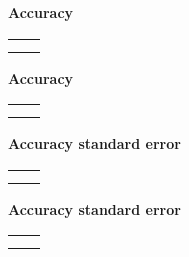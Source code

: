 \documentclass[a4paper]{article}
\begin{document}
\begin{landscape}
\begin{center}
{\Large\bf Accuracy}\\
\begin{tabular}{cc}
 & \\
 & \\
\end{tabular}
\end{center}
\newpage
\begin{center}
{\Large\bf Accuracy}\\
\begin{tabular}{cc}
 & \\
 & \\
\end{tabular}
\end{center}
\newpage
\begin{center}
{\Large\bf Accuracy standard error}\\
\begin{tabular}{cc}
 & \\
 & \\
\end{tabular}
\end{center}
\newpage
\begin{center}
{\Large\bf Accuracy standard error}\\
\begin{tabular}{cc}
 & \\
 & \\
\end{tabular}
\end{center}
\end{landscape}
\restoregeometry
\end{document}
